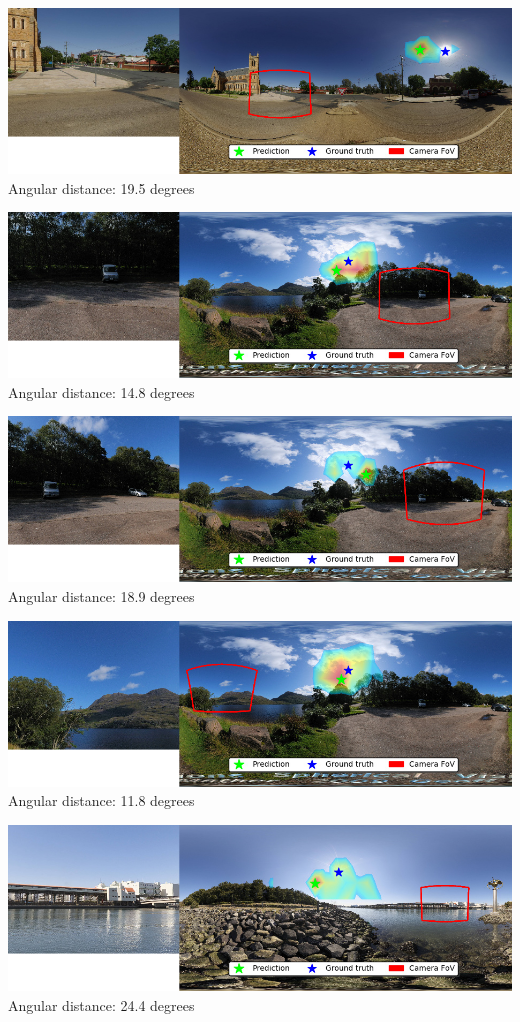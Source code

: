 \begin{multicols}{2}
\includegraphics[width=\mywidth]{pano_aagpbpdmorbfwq_002.jpg}\\
Angular distance: 19.5 degrees

\includegraphics[width=\mywidth]{pano_aaihqlchfeptuj_003.jpg}\\
Angular distance: 14.8 degrees

\includegraphics[width=\mywidth]{pano_aaihqlchfeptuj_004.jpg}\\
Angular distance: 18.9 degrees

\includegraphics[width=\mywidth]{pano_aaihqlchfeptuj.jpg}\\
Angular distance: 11.8 degrees

\includegraphics[width=\mywidth]{pano_aakgxuckdrzzpz.jpg}\\
Angular distance: 24.4 degrees


\end{multicols}
